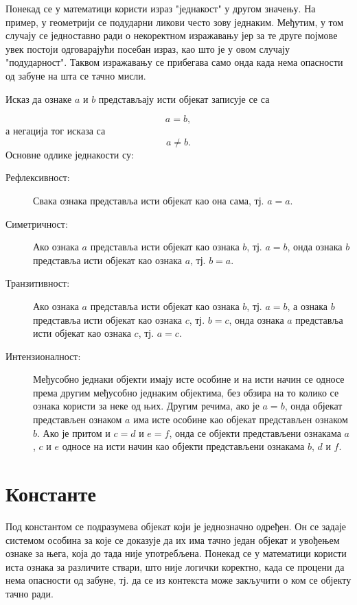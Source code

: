 \documentclass[a4paper]{book}
\newcommand{\tj}{\mbox{тј.} }
\begin{document}
Понекад се у математици користи израз "једнакост" у другом значењу. На пример, у геометрији се подударни ликови
често зову једнаким. Међутим, у том случају се једноставно ради о некоректном изражавању јер за те друге
појмове увек постоји одговарајући посебан израз, као што је у овом случају "подударност".
Таквом изражавању се прибегава само онда када нема опасности од забуне на шта се тачно мисли.

Исказ да ознаке $a$ и $b$ представљају исти објекат записује се са

$$
a=b,
$$
а негација тог исказа са
$$
a\neq b.
$$
Основне одлике једнакости су:
\begin{description}
\item[Рефлексивност:]
Свака ознака представља исти објекат као она сама, \tj $a=a$.
\item[Симетричност:]
Ако ознака $a$ представља исти објекат као ознака $b$, \tj $a=b$, онда ознака $b$ представља исти објекат као ознака $a$, \tj $b=a$.
\item[Транзитивност:]
Ако ознака $a$ представља исти објекат као ознака $b$, \tj $a=b$, а ознака $b$ представља исти објекат као ознака $c$, \tj $b=c$,
онда ознака $a$ представља исти објекат као ознака $c$, \tj $a=c$.
\item[Интензионалност:]
Међусобно једнаки објекти имају исте особине и на исти начин се односе према другим међусобно једнаким објектима, без обзира
на то колико се ознака користи за неке од њих. Другим речима, ако је $a=b$, онда објекат представљен ознаком $a$ има исте особине
као објекат представљен ознаком $b$. Ако је притом и $c=d$ и $e=f$, онда се објекти представљени ознакама $a$, $c$ и $e$
односе на исти начин као објекти представљени ознакама $b$, $d$ и $f$.
\end{description}

\section{Константе}

\indent

Под константом се подразумева објекат који је једнозначно одређен. Он се задаје си\-сте\-мом особина за које се доказује
да их има тачно један објекат и увођењем ознаке за њега, која до тада није употребљена. Понекад се у математици користи
иста ознака за различите ствари, што није логички коректно, када се процени да нема опасности од забуне, \tj
да се из контекста може закључити о ком се објекту тачно ради.
\end{document}
